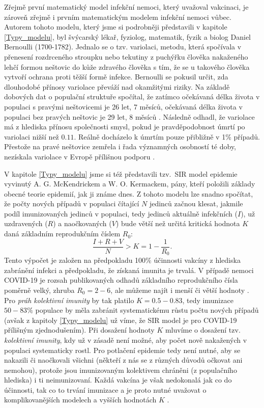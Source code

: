 Zřejmě první matematický model infekční nemoci, který uvažoval vakcinaci, je zároveň zřejmě i prvním matematickým modelem infekční nemoci vůbec. Autorem tohoto modelu, který jsme si podrobněji představili v kapitole \ref{Typy_modelu}, byl švýcarský lékař, fyziolog, matematik, fyzik a biolog Daniel Bernoulli (1700-1782). Jednalo se o tzv. variolaci, metodu, která spočívala v přenesení rozdrceného stroupku nebo tekutiny z puchýřku člověka nakaženého lehčí formou neštovic do kůže zdravého člověka s tím, že se u takového člověka vytvoří ochrana proti těžší formě infekce. Bernoulli se pokusil určit, zda dlouhodobé přínosy variolace převáží nad okamžitými riziky. Na základě dobových dat o populační struktuře spočítal, že zatímco očekávaná délka života v populaci s pravými neštovicemi je 26 let, 7 měsíců, očekávaná délka života v populaci bez pravých neštovic je 29 let, 8 měsíců \cite{Bacaer2011}. Následně odhadl, že variolace má z hlediska přínosu společnosti smysl, pokud je pravděpodobnost úmrtí po variolaci nižší než $0.11$. Reálně docházelo k úmrtím pouze přibližně v 1\% případů. Přestože na pravé neštovice zemřela i řada významných osobností té doby, nezískala variolace v Evropě přílišnou podporu \cite{Bacaer2011}.

V kapitole \ref{Typy_modelu} jsme si též představili tzv.\ SIR model epidemie vyvinutý A. G. McKendrickem a W. O. Kermackem, pány, kteří položili základy obecné teorie epidemií, jak ji známe dnes. Z tohoto modelu lze snadno spočítat, že počty nových případů v populaci čítající $N$ jedinců začnou klesat, jakmile podíl imunizovaných jedinců v populaci, tedy jedinců aktuálně infekčních ($I$), už uzdravených ($R$) a naočkovaných ($V$) bude větší než určitá kritická hodnota $K$ daná základním reprodukčním číslem $R_0$:
\begin{equation}
\frac{I+R+V}{N} > K = 1-\frac{1}{R_0}.
\end{equation}
Tento výpočet je založen na předpokladu 100\% účinnosti vakcíny z hlediska zabránění infekci a předpokladu, že získaná imunita je trvalá. V případě nemoci COVID-19 je rozsah publikovaných odhadů základního reprodukčního čísla poměrně velký, zhruba $R_0 = 2-6$, ale můžeme najít i menší či větší hodnoty \cite[a uvnitř citované reference]{Billah_etal2020,Locatelli_etal2021}. Pro \emph{práh kolektivní imunity} by tak platilo $K = 0.5-0.83$, tedy imunizace $50-83\%$ populace by měla zabránit systematickému růstu počtu nových případů (avšak z kapitoly \ref{Typy_modelu} už víme, že SIR model je pro COVID-19 přílišným zjednodušením). Při dosažení hodnoty $K$ mluvíme o dosažení tzv. \emph{kolektivní imunity}, kdy už v zásadě není možné, aby počet nově nakažených v populaci systematicky rostl. Pro potlačení epidemie tedy není nutné, aby se nakazili či naočkovali všichni (někteří z nás se z různých důvodů očkovat ani nemohou), protože jsou imunizovaným kolektivem chráněni (z populačního hlediska) i ti neimunizovaní. Každá vakcína je však nedokonalá jak co do účinnosti, tak co to trvání imunizace a je proto nutné uvažovat o komplikovanějších modelech a vyšších hodnotách $K$ \cite{K1,K2}.


